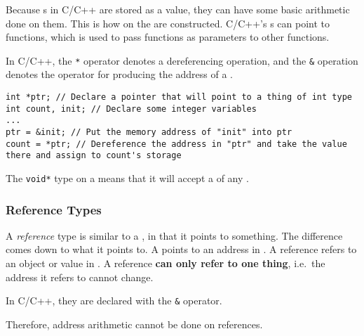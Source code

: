 Because s in C/C++ are stored as a value, they can have some basic arithmetic done on them.
This is how  on the  are constructed.
C/C++'s s can point to functions, which is used to pass functions as parameters to other functions.

In C/C++, the \texttt{*} operator denotes a dereferencing operation, and the \texttt{\&} operation denotes the operator for producing the address of a .

\begin{verbatim}
int *ptr; // Declare a pointer that will point to a thing of int type
int count, init; // Declare some integer variables
...
ptr = &init; // Put the memory address of "init" into ptr
count = *ptr; // Dereference the address in "ptr" and take the value there and assign to count's storage
\end{verbatim}

\begin{remark*}
  The \texttt{void*} type on a  means that it will accept a  of any .
\end{remark*}

\subsubsection{Reference Types}\label{subsubsec:Pointer-Reference_Types}
\begin{definition}[Reference]\label{def:Reference}
  A \emph{reference} type  is similar to a , in that it points to something.
  The difference comes down to what it points to.
  A  points to an address in .
  A reference refers to an object or value in .
  A reference \textbf{can only refer to one thing}, i.e.\ the  address it refers to cannot change.

  In C/C++, they are declared with the \texttt{\&} operator.

  \begin{remark}\label{rmk:Reference-Memory_Address_Arithmetic}
    Therefore, address arithmetic cannot be done on references.
  \end{remark}
\end{definition}

